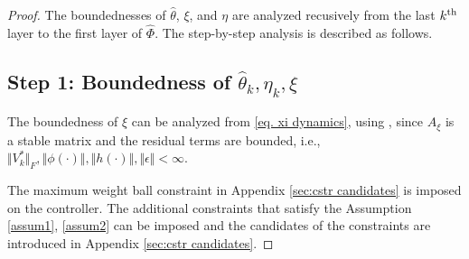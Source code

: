 \documentclass[lettersize,journal]{IEEEtran}
\begin{document}
\begin{proof}

The boundednesses of $\hat\theta$, $\xi$, and $\eta$ are analyzed recusively from the last $k\textsuperscript{th}$ layer to the first layer of $\hat\Phi$. The step-by-step analysis is described as follows.

\subsection*{Step 1: Boundedness of $\hat\theta_k,\eta_k,\xi$}


The boundedness of $\xi$ can be analyzed from \eqref{eq. xi dynamics}, using \cite[Chap.~4 T.~1.9]{RN13}, since $A_\xi$ is a stable matrix and the residual terms are bounded, i.e., $\Vert V_k^*\Vert_F, \Vert \phi(\cdot)\Vert,\Vert h(\cdot)\Vert, \Vert\epsilon\Vert <\infty$.

The maximum weight ball constraint in Appendix \ref{sec:cstr candidates} is imposed on the controller.
The additional constraints that satisfy the Assumption \ref{assum1}, \ref{assum2} can be imposed and the candidates of the constraints are introduced in Appendix \ref{sec:cstr candidates}.


\end{proof}
\end{document}
